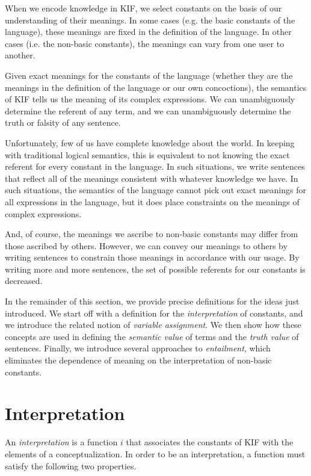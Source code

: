When we encode knowledge in KIF, we select constants on the basis of our
understanding of their meanings.  In some cases (e.g. the basic constants of the
language), these meanings are fixed in the definition of the language.  In other
cases (i.e. the non-basic constants), the meanings can vary from one user to another.

Given exact meanings for the constants of the language (whether they are the
meanings in the definition of the language or our own concoctions), the
semantics of KIF tells us the meaning of its complex expressions.  We can
unambiguously determine the referent of any term, and we can unambiguously
determine the truth or falsity of any sentence. 

Unfortunately, few of us have complete knowledge about the world.  In keeping with
traditional logical semantics, this is equivalent to not knowing the exact referent
for every constant in the language.  In such situations, we write sentences that
reflect all of the meanings consistent with whatever knowledge we have.  In such
situations, the semantics of the language cannot pick out exact meanings for all
expressions in the language, but it does place constraints on the meanings of complex
expressions.

And, of course, the meanings we ascribe to non-basic constants may differ from
those ascribed by others.  However, we can convey our meanings to others by
writing sentences to constrain those meanings in accordance with our usage.  By
writing more and more sentences, the set of possible referents for our constants is
decreased.

In the remainder of this section, we provide precise definitions for the ideas
just introduced.  We start off with a definition for the {\it interpretation} of
constants, and we introduce the related notion of {\it variable assignment}.  We
then show how these concepts are used in defining the {\it semantic value} of
terms and the {\it truth value} of sentences.  Finally, we introduce several
approaches to {\it entailment}, which eliminates the dependence of meaning
on the interpretation of non-basic constants.  

\section{Interpretation}

An {\it interpretation} is a function $i$ that associates the constants of
KIF with the elements of a conceptualization.  In order to be an interpretation, a
function must satisfy the following two properties.

